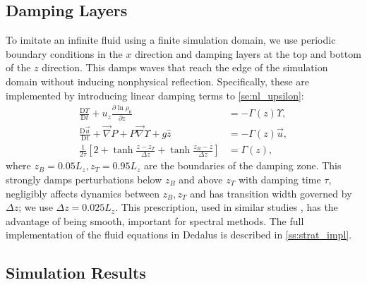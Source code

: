 \documentclass[
        fleqn,
        usenatbib,
    ]{mnras}
\newcommand*{\pd}[2]{\frac{\partial#1}{\partial#2}}
\newcommand*{\md}[2]{\frac{\mathrm{D}#1}{\mathrm{D}#2}}
\newcommand*{\s}[1]{\left[#1\right]}
\begin{document}
\subsection{Damping Layers}\label{ss:damping}

To imitate an infinite fluid using a finite simulation domain, we use periodic
boundary conditions in the $x$ direction and damping layers at the top and
bottom of the $z$ direction. This damps waves that reach the edge of the
simulation domain without inducing nonphysical reflection. Specifically, these
are implemented by introducing linear damping terms to \autoref{se:nl_upsilon}:
\begin{align}
    \md{\Upsilon}{t} + u_z \pd{\ln \rho_0}{z} &=
        -\Gamma(z)\Upsilon,\nonumber\\
    \md{\vec{u}}{t} + \vec{\nabla}P + P\vec{\nabla}\Upsilon + g\hat{z} &=
        - \Gamma(z)\vec{u},\nonumber\\
    \frac{1}{2\tau}\s{2 + \tanh \frac{z - z_T}{\Delta z}
        + \tanh \frac{z_B - z}{\Delta z}} &= \Gamma(z),\label{eq:Gamma}
\end{align}
where $z_B = 0.05L_z, z_T = 0.95L_z$ are the boundaries of the damping zone.
This strongly damps perturbations below $z_B$ and above $z_T$ with damping time
$\tau$, negligibly affects dynamics between $z_B, z_T$ and has transition width
governed by $\Delta z$; we use $\Delta z = 0.025L_z$. This prescription, used in
similar studies \citep{lecoanet_damp}, has the advantage of being smooth,
important for spectral methods. The full implementation of the fluid equations
in Dedalus is described in \autoref{ss:strat_impl}.

\subsection{Simulation Results}\label{ss:lin_ns}
\end{document}
